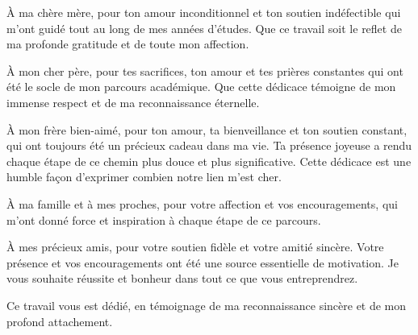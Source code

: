 À ma chère mère,  
pour ton amour inconditionnel et ton soutien indéfectible qui m'ont guidé tout au long de mes années d'études. Que ce travail soit le reflet de ma profonde gratitude et de toute mon affection.

À mon cher père,  
pour tes sacrifices, ton amour et tes prières constantes qui ont été le socle de mon parcours académique. Que cette dédicace témoigne de mon immense respect et de ma reconnaissance éternelle.

À mon frère bien-aimé,  
pour ton amour, ta bienveillance et ton soutien constant, qui ont toujours été un précieux cadeau dans ma vie. Ta présence joyeuse a rendu chaque étape de ce chemin plus douce et plus significative. Cette dédicace est une humble façon d’exprimer combien notre lien m’est cher.

À ma famille et à mes proches,  
pour votre affection et vos encouragements, qui m’ont donné force et inspiration à chaque étape de ce parcours.

À mes précieux amis,  
pour votre soutien fidèle et votre amitié sincère. Votre présence et vos encouragements ont été une source essentielle de motivation. Je vous souhaite réussite et bonheur dans tout ce que vous entreprendrez.

Ce travail vous est dédié, en témoignage de ma reconnaissance sincère et de mon profond attachement.
